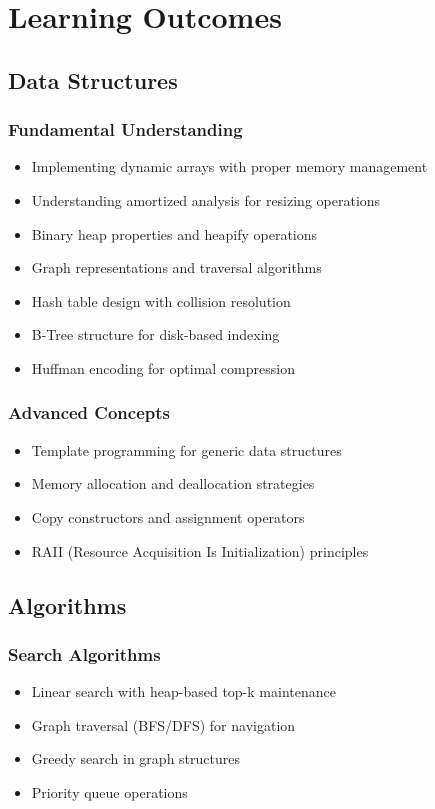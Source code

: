 \documentclass[12pt,a4paper]{article}
\begin{document}
\section{Learning Outcomes}

\subsection{Data Structures}

\subsubsection{Fundamental Understanding}
\begin{itemize}
    \item Implementing dynamic arrays with proper memory management
    \item Understanding amortized analysis for resizing operations
    \item Binary heap properties and heapify operations
    \item Graph representations and traversal algorithms
    \item Hash table design with collision resolution
    \item B-Tree structure for disk-based indexing
    \item Huffman encoding for optimal compression
\end{itemize}

\subsubsection{Advanced Concepts}
\begin{itemize}
    \item Template programming for generic data structures
    \item Memory allocation and deallocation strategies
    \item Copy constructors and assignment operators
    \item RAII (Resource Acquisition Is Initialization) principles
\end{itemize}

\subsection{Algorithms}

\subsubsection{Search Algorithms}
\begin{itemize}
    \item Linear search with heap-based top-k maintenance
    \item Graph traversal (BFS/DFS) for navigation
    \item Greedy search in graph structures
    \item Priority queue operations
\end{itemize}
\end{document}
